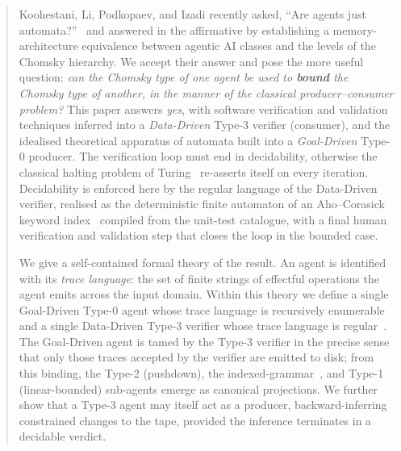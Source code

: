 \begin{abstract}
Koohestani, Li, Podkopaev, and Izadi recently asked, ``Are agents
just automata?''~\cite{koohestani2025automata} and answered in
the affirmative by establishing a memory-architecture equivalence
between agentic AI classes and the levels of the Chomsky
hierarchy.  We accept their answer and pose the more useful
question: \emph{can the Chomsky type of one agent be used to
\textbf{bound} the Chomsky type of another, in the manner of the
classical producer--consumer problem?}  This paper answers
\emph{yes}, with software verification and validation
techniques inferred into a \emph{Data-Driven} Type-3 verifier
(consumer), and the idealised theoretical apparatus of automata
built into a \emph{Goal-Driven} Type-0 producer.  The verification
loop must end in decidability, otherwise the classical halting
problem of Turing~\cite{turing1936computable} re-asserts itself
on every iteration.  Decidability is enforced here by the regular
language of the Data-Driven verifier, realised as the
deterministic finite automaton of an Aho--Corasick keyword
index~\cite{aho1975corasick} compiled from the unit-test
catalogue, with a final human verification and validation step
that closes the loop in the bounded case.

We give a self-contained formal theory of the result.  An agent is
identified with its \emph{trace language}: the set of finite
strings of effectful operations the agent emits across the input
domain.  Within this theory we define a single Goal-Driven Type-0
agent whose trace language is recursively
enumerable~\cite{robinson1949definability,davis1961decision} and a
single Data-Driven Type-3 verifier whose trace language is
regular~\cite{rabin1959finite,chomsky1956three,chomsky1959certain}.
The Goal-Driven agent is tamed by the Type-3 verifier in the
precise sense that only those traces accepted by the verifier are
emitted to disk; from this binding, the Type-2 (pushdown), the
indexed-grammar~\cite{aho1968indexed}, and Type-1 (linear-bounded)
sub-agents emerge as canonical projections.  We further show that
a Type-3 agent may itself act as a producer, backward-inferring
constrained changes to the tape, provided the inference terminates
in a decidable verdict.


\end{abstract}
